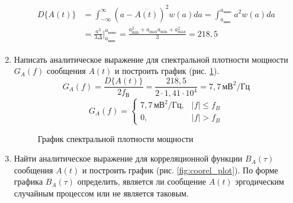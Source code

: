 \documentclass[a4paper, 12pt]{article}
\begin{document}
\begin{enumerate}
  \begin{align*}\begin{split}
    D\{A(t)\}&=\int^\infty_{-\infty}(a-\overline{A(t)})^2 w(a)da=
    \int^{a_{макс}}_{a_{мин}}a^2w(a)da\\
    &=\frac{a^3}{3\Delta}\Biggr|^{a_{макс}}_{a_{мин}}\!
    =\frac{a_\text{min}^2+a_\text{max}a_\text{min}+a_\text{max}^2}{3}
    =218,5
  \end{split}\end{align*}
  \item Написать аналитическое выражение для спектральной плотности
  мощности $G_A(f)$ сообщения $A(t)$ и построить график 
  (рис. \ref{fig:spectr_plot}).
  \[ G_A(f)=\frac{D\{A(t)\}}{2f_В}=\frac{218,5}{2\cdot1,41\cdot 10^4}
  =7,7 \,мВ^2/Гц \]
  \[ G_A(f)=\begin{cases}
    7,7 \,мВ^2/Гц, & |f| \leq f_B\\
    0, & |f| > f_B
  \end{cases} \]
  \begin{figure}[H]
    \centering
    \caption{График спектральной плотности мощности}
    \label{fig:spectr_plot}
  \end{figure}
  \item Найти аналитическое выражение для корреляционной функции
  $B_A(\tau)$ сообщения $A(t)$ и построить график 
  (рис. \ref{fig:coorel_plot}). 
  По форме графика $B_A(\tau)$ определить, 
  является ли сообщение $A(t)$ эргодическим случайным процессом 
  или не является таковым.


\end{enumerate}
\end{document}
